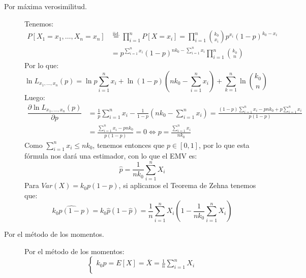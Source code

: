 \begin{ejercicio}
    \begin{description}
        \item [Por máxima verosimilitud.] 
            Tenemos:
            \begin{align*}
                P[X_1 =x_1, \ldots, X_n = x_n] &\stackrel{\text{iid.}}{=}\prod_{i=1}^{n} P[X=x_i] = \prod_{i=1}^{n} \binom{k_0}{x_i} p^{x_i}{(1-p)}^{k_0-x_i} \\ &= p^{\sum\limits_{i=1}^{n}x_i}{(1-p)}^{nk_0-\sum\limits_{i=1}^{n}x_i} \prod_{i=1}^{n}\binom{k_0}{n}
            \end{align*}
            Por lo que:
            \begin{equation*}
                \ln L_{x_1,\ldots,x_n}(p) = \ln p \sum_{i=1}^{n}x_i + \ln(1-p)\left(nk_0 - \sum_{i=1}^{n}x_i\right) + \sum_{k=1}^{n}\ln\binom{k_0}{n}
            \end{equation*}
            Luego:
            \begin{align*}
                \dfrac{\partial \ln L_{x_1,\ldots,x_n}(p)}{\partial p} &= \frac{1}{p}\sum_{i=1}^{n}x_i - \frac{1}{1-p}\left(nk_0 - \sum_{i=1}^{n}x_i\right) = \frac{(1-p)\sum\limits_{i=1}^{n}x_i - pnk_0 + p\sum\limits_{i=1}^{n}x_i}{p(1-p)} \\
                                                                       &= \frac{\sum\limits_{i=1}^{n}x_i -pnk_0}{p(1-p)} = 0 \Longleftrightarrow p = \frac{\sum\limits_{i=1}^{n}x_i}{nk_0}
            \end{align*}
            Como $\sum\limits_{i=1}^{n}x_i\leq nk_0$, tenemos entonces que $p\in [0,1]$, por lo que esta fórmula nos dará una estimador, con lo que el EMV es:
            \begin{equation*}
                \hat{p} = \frac{1}{nk_0}\sum_{i=1}^{n}X_i
            \end{equation*}
            Para $Var(X) = k_0p(1-p)$, si aplicamos el Teorema de Zehna tenemos que:
            \begin{equation*}
                \widehat{k_0p(1-p)} = k_0\hat{p}(1-\hat{p}) = \frac{1}{n}\sum_{i=1}^{n}X_i\left(1-\frac{1}{nk_0}\sum_{i=1}^{n}X_i\right)
            \end{equation*}
        \item [Por el método de los momentos.] 
            Por el método de los momentos:
            \begin{equation*}
                \left\{\begin{array}{l}
                        k_0p = E[X] = \overline{X} = \frac{1}{n}\sum\limits_{i=1}^{n}X_i \\

\end{array}
\end{equation*}
\end{description}
\end{ejercicio}

